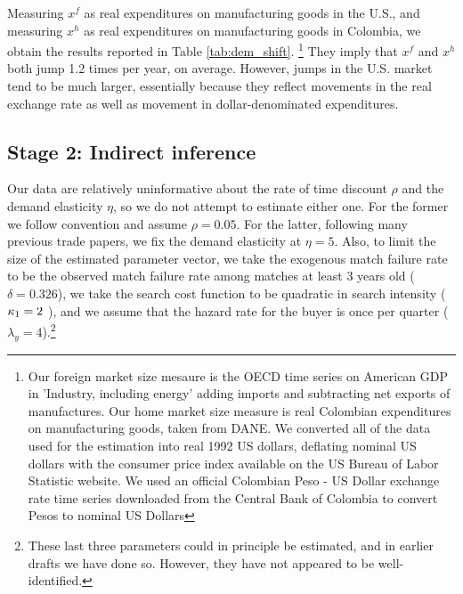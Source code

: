 \documentclass[12pt]{article}
\begin{document}
Measuring $x^{f}$ as real expenditures on manufacturing goods in the U.S.,
and measuring $x^{h}$ as real expenditures on manufacturing goods in
Colombia, we obtain the results reported in Table \ref{tab:dem_shift}.%
\footnote{%
Our foreign market size mesaure is the OECD time series on American GDP in
'Industry, including energy' adding imports and subtracting net exports of
manufactures. Our home market size measure is real Colombian expenditures on
manufacturing goods, taken from DANE. We converted all of the data used for
the estimation into real 1992 US dollars, deflating nominal US dollars with
the consumer price index available on the US Bureau of Labor Statistic
website. We used an official Colombian Peso - US Dollar exchange rate time
series downloaded from the Central Bank of Colombia to convert Pesos to
nominal US Dollars} They imply that $x^{f}$ and $x^{h}$ both jump 1.2 times
per year, on average. However, jumps in the U.S. market tend to be much
larger, essentially because they reflect movements in the real exchange rate
as well as movement in dollar-denominated expenditures.

\label{sec:indirect_inference}

\subsection{Stage 2: Indirect inference}

\FloatBarrier

Our data are relatively uninformative about the rate of time discount $\rho $
and the demand elasticity $\eta $, so we do not attempt to estimate either
one$.$ For the former we follow convention and assume $\rho =0.05$. For the
latter, following many previous trade papers, we fix the demand elasticity
at $\eta =5.$ Also, to limit the size of the estimated parameter vector, we
take the exogenous match failure rate to be the observed match failure rate
among matches at least 3 years old ($\delta =0.326$), we take the search
cost function to be quadratic in search intensity (${\small \kappa _{1}}=2$%
), and we assume that the hazard rate for the buyer is once per quarter ($%
\lambda _{y}=4$).\footnote{%
These last three parameters could in principle be estimated, and in earlier
drafts we have done so. However, they have not appeared to be
well-identified.}
\end{document}
